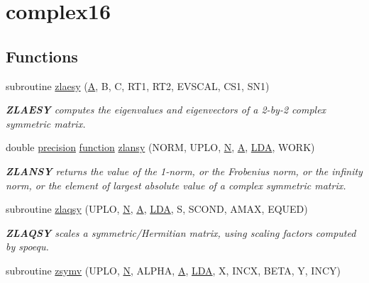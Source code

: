 \hypertarget{group__complex16SYauxiliary}{}\section{complex16}
\label{group__complex16SYauxiliary}
\subsection*{Functions}
\begin{DoxyCompactItemize}
\item 
subroutine \hyperlink{group__complex16SYauxiliary_gade54011df54cab1e5e981e6a86ac2dc2}{zlaesy} (\hyperlink{classA}{A}, B, C, R\+T1, R\+T2, E\+V\+S\+C\+A\+L, C\+S1, S\+N1)
\begin{DoxyCompactList}\small\item\em {\bfseries Z\+L\+A\+E\+S\+Y} computes the eigenvalues and eigenvectors of a 2-\/by-\/2 complex symmetric matrix. \end{DoxyCompactList}\item 
double \hyperlink{numinquire_8h_a2c8e616467665d0b2814d4c1589ba74e}{precision} \hyperlink{afunc_8m_a7b5e596df91eadea6c537c0825e894a7}{function} \hyperlink{group__complex16SYauxiliary_gae1d67e9c7403f3d6e2c5db6073b014d3}{zlansy} (N\+O\+R\+M, U\+P\+L\+O, \hyperlink{polmisc_8c_a0240ac851181b84ac374872dc5434ee4}{N}, \hyperlink{classA}{A}, \hyperlink{example__user_8c_ae946da542ce0db94dced19b2ecefd1aa}{L\+D\+A}, W\+O\+R\+K)
\begin{DoxyCompactList}\small\item\em {\bfseries Z\+L\+A\+N\+S\+Y} returns the value of the 1-\/norm, or the Frobenius norm, or the infinity norm, or the element of largest absolute value of a complex symmetric matrix. \end{DoxyCompactList}\item 
subroutine \hyperlink{group__complex16SYauxiliary_ga32c00d5ce9d568146d9396257bdea188}{zlaqsy} (U\+P\+L\+O, \hyperlink{polmisc_8c_a0240ac851181b84ac374872dc5434ee4}{N}, \hyperlink{classA}{A}, \hyperlink{example__user_8c_ae946da542ce0db94dced19b2ecefd1aa}{L\+D\+A}, S, S\+C\+O\+N\+D, A\+M\+A\+X, E\+Q\+U\+E\+D)
\begin{DoxyCompactList}\small\item\em {\bfseries Z\+L\+A\+Q\+S\+Y} scales a symmetric/\+Hermitian matrix, using scaling factors computed by spoequ. \end{DoxyCompactList}\item 
subroutine \hyperlink{group__complex16SYauxiliary_gab9b336644e5cff134d305d70730e60ba}{zsymv} (U\+P\+L\+O, \hyperlink{polmisc_8c_a0240ac851181b84ac374872dc5434ee4}{N}, A\+L\+P\+H\+A, \hyperlink{classA}{A}, \hyperlink{example__user_8c_ae946da542ce0db94dced19b2ecefd1aa}{L\+D\+A}, X, I\+N\+C\+X, B\+E\+T\+A, Y, I\+N\+C\+Y)

\end{DoxyCompactItemize}

